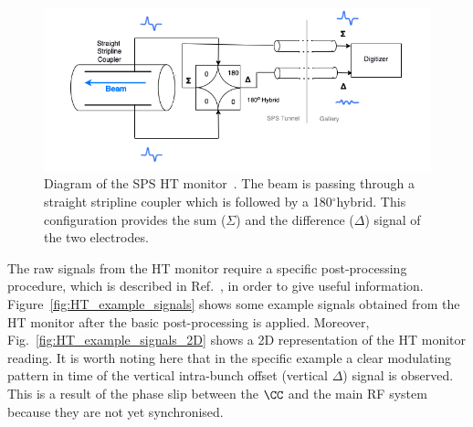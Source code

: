 \begin{figure}[h]%
   \centering         
   \includegraphics[width=1.0\textwidth]{images/Ch4/HT_monitor_sketch.png}
       \caption{Diagram of the SPS HT monitor~\cite{Levens:2313358}. The beam is passing through a straight stripline coupler which is followed by a 180$^\circ$hybrid. This configuration provides the sum ($\Sigma$) and the difference ($\Delta$) signal of the two electrodes.} %
       \label{fig:SPS_HT_diagram}
\end{figure}

The raw signals from the HT monitor require a specific post-processing procedure, which is described in Ref.~\cite{Levens:2313358}, in order to give useful information. Figure~\ref{fig:HT_example_signals} shows some example signals obtained from the HT monitor after the basic post-processing is applied. Moreover, Fig.~\ref{fig:HT_example_signals_2D} shows a 2D representation of the HT monitor reading. It is worth noting here that in the specific example a clear modulating pattern in time of the vertical intra-bunch offset (vertical $\Delta$) signal is observed. This is a result of the phase slip between the $\CC$ and the main RF system because they are not yet synchronised. 

